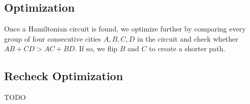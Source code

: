 \documentclass[letterpaper,11pt]{article}
\begin{document}

		\subsection{Optimization}
			Once a Hamiltonian circuit is found, we optimize further by
			comparing every group of four consecutive cities $A, B, C, D$ in
			the circuit and check whether $AB+CD > AC+BD$. If so, we flip $B$
			and $C$ to create a shorter path.


		\subsection{Recheck Optimization}
			TODO

\end{document}
